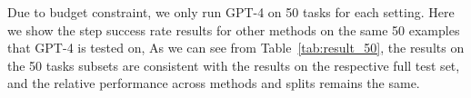 Due to budget constraint, we only run GPT-4 on \num{50} tasks for each setting. Here we show the step success rate results for other methods on the same \num{50} examples that GPT-4 is tested on,  
As we can see from Table~\ref{tab:result_50}, the results on the \num{50} tasks subsets are consistent with the results on the respective full test set, and the relative performance across methods and splits remains the same.

